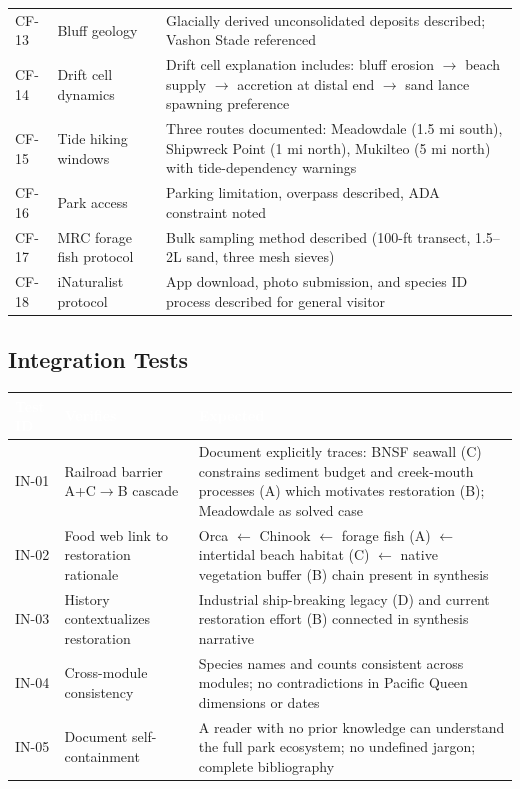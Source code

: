 \documentclass[11pt,letterpaper]{article}
\newcommand{\tableheader}[1]{\textbf{\sffamily\textcolor{white}{#1}}}
\begin{document}
\begin{center}
\begin{tabularx}{\textwidth}{L{1.5cm}L{3.5cm}X}
CF-13 & Bluff geology & Glacially derived unconsolidated deposits described; Vashon Stade referenced \\
CF-14 & Drift cell dynamics & Drift cell explanation includes: bluff erosion $\rightarrow$ beach supply $\rightarrow$ accretion at distal end $\rightarrow$ sand lance spawning preference \\
CF-15 & Tide hiking windows & Three routes documented: Meadowdale (1.5 mi south), Shipwreck Point (1 mi north), Mukilteo (5 mi north) with tide-dependency warnings \\
CF-16 & Park access & Parking limitation, overpass described, ADA constraint noted \\
CF-17 & MRC forage fish protocol & Bulk sampling method described (100-ft transect, 1.5--2L sand, three mesh sieves) \\
CF-18 & iNaturalist protocol & App download, photo submission, and species ID process described for general visitor \\
\bottomrule
\end{tabularx}
\end{center}

\subsection{Integration Tests}

\begin{center}
\begin{tabularx}{\textwidth}{L{1.5cm}L{3.5cm}X}
\toprule
{}
\tableheader{Test ID} & \tableheader{Verifies} & \tableheader{Expected} \\
\midrule
IN-01 & Railroad barrier A+C$\rightarrow$B cascade & Document explicitly traces: BNSF seawall (C) constrains sediment budget and creek-mouth processes (A) which motivates restoration (B); Meadowdale as solved case \\
IN-02 & Food web link to restoration rationale & Orca $\leftarrow$ Chinook $\leftarrow$ forage fish (A) $\leftarrow$ intertidal beach habitat (C) $\leftarrow$ native vegetation buffer (B) chain present in synthesis \\
IN-03 & History contextualizes restoration & Industrial ship-breaking legacy (D) and current restoration effort (B) connected in synthesis narrative \\
IN-04 & Cross-module consistency & Species names and counts consistent across modules; no contradictions in Pacific Queen dimensions or dates \\
IN-05 & Document self-containment & A reader with no prior knowledge can understand the full park ecosystem; no undefined jargon; complete bibliography \\
\bottomrule
\end{tabularx}
\end{center}
\end{document}

